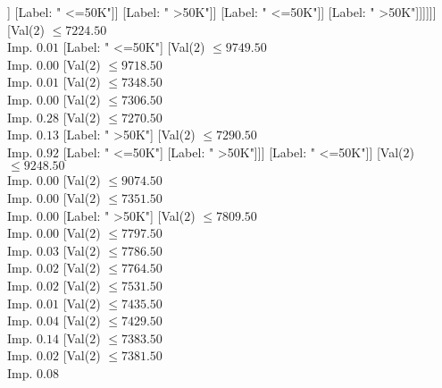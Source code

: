 \documentclass[margin=10pt]{standalone}
\begin{document}
\begin{forest}
																																	[Label: " >50K"]]
																																[Label: " <=50K"]]
																															[Label: " >50K"]]
																														[Label: " <=50K"]]
																													[Label: " >50K"]]]]]]
																								[Val($2$) $ \leq 7224.50$ \\ Imp. $0.01$
																									[Label: " <=50K"]
																									[Val($2$) $ \leq 9749.50$ \\ Imp. $0.00$
																										[Val($2$) $ \leq 9718.50$ \\ Imp. $0.01$
																											[Val($2$) $ \leq 7348.50$ \\ Imp. $0.00$
																												[Val($2$) $ \leq 7306.50$ \\ Imp. $0.28$
																													[Val($2$) $ \leq 7270.50$ \\ Imp. $0.13$
																														[Label: " >50K"]
																														[Val($2$) $ \leq 7290.50$ \\ Imp. $0.92$
																															[Label: " <=50K"]
																															[Label: " >50K"]]]
																													[Label: " <=50K"]]
																												[Val($2$) $ \leq 9248.50$ \\ Imp. $0.00$
																													[Val($2$) $ \leq 9074.50$ \\ Imp. $0.00$
																														[Val($2$) $ \leq 7351.50$ \\ Imp. $0.00$
																															[Label: " >50K"]
																															[Val($2$) $ \leq 7809.50$ \\ Imp. $0.00$
																																[Val($2$) $ \leq 7797.50$ \\ Imp. $0.03$
																																	[Val($2$) $ \leq 7786.50$ \\ Imp. $0.02$
																																		[Val($2$) $ \leq 7764.50$ \\ Imp. $0.02$
																																			[Val($2$) $ \leq 7531.50$ \\ Imp. $0.01$
																																				[Val($2$) $ \leq 7435.50$ \\ Imp. $0.04$
																																					[Val($2$) $ \leq 7429.50$ \\ Imp. $0.14$
																																						[Val($2$) $ \leq 7383.50$ \\ Imp. $0.02$
																																							[Val($2$) $ \leq 7381.50$ \\ Imp. $0.08$

\end{forest}
\end{document}
